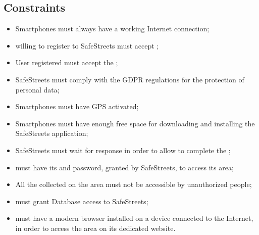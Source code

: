 \documentclass[../../RASD.tex]{subfiles}
\begin{document}
 \subsection{Constraints}
 	\begin{itemize}
 		\item Smartphones must always have a working Internet connection;
 		\item {} willing to register to SafeStreets must accept ;
 		\item User registered must accept the ;
 		\item SafeStreets must comply with the GDPR regulations for the protection of  personal data;
 		\item Smartphones must have GPS activated;
 		\item Smartphones must have enough free space for downloading and installing the SafeStreets application;
 		\item SafeStreets must wait for  response in order to allow  to complete the ;
 		\item {} must have its  and password, granted by SafeStreets, to access its  area;
 		\item All the collected  on the  area must not be accessible by unauthorized people;
 		\item {} must grant  Database access to SafeStreets;
 		\item {} must have a modern browser installed on a device connected to the Internet, in order to access the  area on its dedicated website. 

 	\end{itemize}
\end{document}
